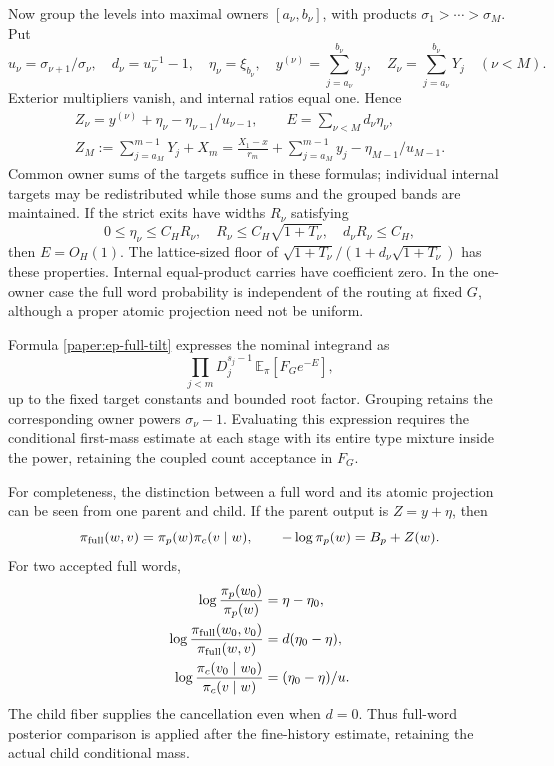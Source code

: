 Now group the levels into maximal owners $[a_\nu,b_\nu]$, with
products $\sigma_1>\cdots>\sigma_M$. Put
\[
 u_\nu=\sigma_{\nu+1}/\sigma_\nu,\quad
 d_\nu=u_\nu^{-1}-1,\quad\eta_\nu=\xi_{b_\nu},\quad
 y^{(\nu)}=\sum_{j=a_\nu}^{b_\nu}y_j,\quad
 Z_\nu=\sum_{j=a_\nu}^{b_\nu}Y_j\quad(\nu<M).
\]
Exterior multipliers vanish, and internal ratios equal one. Hence
\begin{gather}
 Z_\nu=y^{(\nu)}+\eta_\nu-\eta_{\nu-1}/u_{\nu-1},\qquad
 E=\sum_{\nu<M}d_\nu\eta_\nu,\label{paper:ep-grouped-carry}\\
 Z_M:=\sum_{j=a_M}^{m-1}Y_j+X_m
 =\frac{X_1-x}{r_m}+\sum_{j=a_M}^{m-1}y_j
       -\eta_{M-1}/u_{M-1}.\label{paper:ep-grouped-terminal}
\end{gather}
Common owner sums of the targets suffice in these formulas; individual
internal targets may be redistributed while those sums and the grouped
bands are maintained. If the strict exits have widths $R_\nu$ satisfying
\[
 0\le\eta_\nu\le C_HR_\nu,\quad
 R_\nu\le C_H\sqrt{1+T_\nu},\quad d_\nu R_\nu\le C_H,
\]
then $E=O_H(1)$. The lattice-sized floor of
$\sqrt{1+T_\nu}/(1+d_\nu\sqrt{1+T_\nu})$ has these properties.
Internal equal-product carries have coefficient zero. In the one-owner
case the full word probability is independent of the routing at fixed
$G$, although a proper atomic projection need not be uniform.

Formula \eqref{paper:ep-full-tilt} expresses the nominal integrand as
\[
 \prod_{j<m}D_j^{s_j-1}\,\mathbb E_\pi[F_Ge^{-E}],
\]
up to the fixed target constants and bounded root factor. Grouping retains
the corresponding owner powers $\sigma_\nu-1$. Evaluating this expression
requires the conditional first-mass estimate at each stage with its
entire type mixture inside the power, retaining the coupled count
acceptance in $F_G$.

For completeness, the distinction between a full word and its atomic
projection can be seen from one parent and child. If the parent output
is $Z=y+\eta$, then
\[
 \pi_{\rm full}(w,v)=\pi_p(w)\pi_c(v\mid w),\qquad
 -\log\pi_p(w)=B_p+Z(w).
\]
For two accepted full words,
\begin{align*}
 \log\frac{\pi_p(w_0)}{\pi_p(w)}&=\eta-\eta_0,\\
 \log\frac{\pi_{\rm full}(w_0,v_0)}{\pi_{\rm full}(w,v)}
   &=d(\eta_0-\eta),\\
 \log\frac{\pi_c(v_0\mid w_0)}{\pi_c(v\mid w)}&=(\eta_0-\eta)/u.
\end{align*}
The child fiber supplies the cancellation even when $d=0$.
Thus full-word posterior comparison is applied after the fine-history
estimate, retaining the actual child conditional mass.


